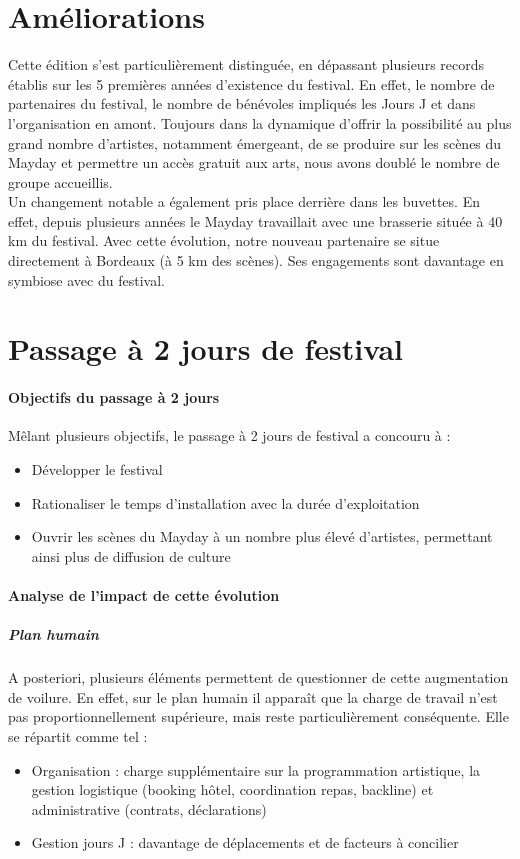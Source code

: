 \documentclass[12pt,a4paper]{report}
\begin{document}
\section{Améliorations}
Cette édition s'est particulièrement distinguée, en dépassant plusieurs records établis sur les 5 premières années d'existence du festival. En effet, le nombre de partenaires du festival, le nombre de bénévoles impliqués les Jours J et dans l'organisation en amont. Toujours dans la dynamique d'offrir la possibilité au plus grand nombre d'artistes, notamment émergeant, de se produire sur les scènes du Mayday et permettre un accès gratuit aux arts, nous avons doublé le nombre de groupe accueillis.\\

Un changement notable a également pris place derrière dans les buvettes. En effet, depuis plusieurs années le Mayday travaillait avec une brasserie située à 40 km du festival. Avec cette évolution, notre nouveau partenaire se situe directement à Bordeaux (à 5 km des scènes). Ses engagements sont davantage en symbiose avec du festival.

\section{Passage à 2 jours de festival}

\paragraph{Objectifs du passage à 2 jours}
Mêlant plusieurs objectifs, le passage à 2 jours de festival a concouru à : 
\begin{itemize}
\item Développer le festival
\item Rationaliser le temps d'installation avec la durée d'exploitation
\item Ouvrir les scènes du Mayday à un nombre plus élevé d'artistes, permettant ainsi plus de diffusion de culture
\end{itemize}

\paragraph{Analyse de l'impact de cette évolution}
\subparagraph{Plan humain}
A posteriori, plusieurs éléments permettent de questionner de cette augmentation de voilure. En effet, sur le plan humain il apparaît que la charge de travail n'est pas proportionnellement supérieure, mais reste particulièrement conséquente. Elle se répartit comme tel : 
\begin{itemize}
\item Organisation : charge supplémentaire sur la programmation artistique, la gestion logistique (booking hôtel, coordination repas, backline) et administrative (contrats, déclarations)
\item Gestion jours J : davantage de déplacements et de facteurs à concilier
\end{itemize}
\end{document}
